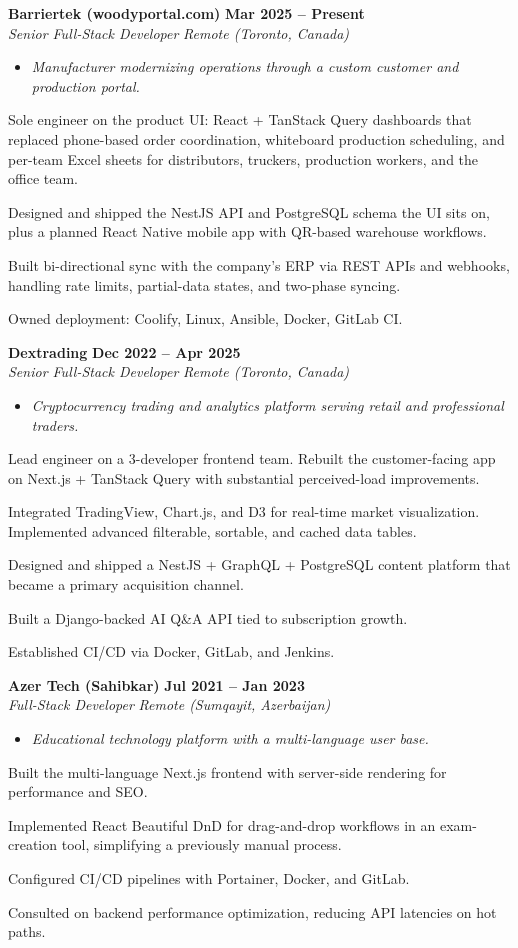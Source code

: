 \documentclass[letterpaper,10pt]{article}
\newcommand{\heading}[2]{
  \hspace{10pt}#1\hfill#2\\
}
\newcommand{\headingBf}[2]{
  \heading{\textbf{#1}}{\textbf{#2}}
}
\newcommand{\headingIt}[2]{
  \heading{\textit{#1}}{\textit{#2}}
}
\newenvironment{resume_list}{
  \vspace{-7pt}
  \begin{itemize}[itemsep=-2px, parsep=1pt, leftmargin=30pt]
}{
  \end{itemize}
  \vspace{2pt}
}
\newcommand{\companyDescription}[1]{
  \vspace{-7pt}
  \begin{itemize}[itemsep=-2px, parsep=1pt, leftmargin=12pt]
    \item[] {\color{textMuted}\textit{#1}}
  \end{itemize}
  \vspace{-4pt}
}
\begin{document}
  \headingBf{ Barriertek (woodyportal.com) }{ Mar 2025 -- Present }
  \headingIt{ Senior Full-Stack Developer }{ Remote (Toronto, Canada) }
  \companyDescription{ Manufacturer modernizing operations through a custom customer and production portal. }
  \begin{resume_list}
    \item Sole engineer on the product UI: React + TanStack Query dashboards that replaced phone-based order coordination, whiteboard production scheduling, and per-team Excel sheets for distributors, truckers, production workers, and the office team.
    \item Designed and shipped the NestJS API and PostgreSQL schema the UI sits on, plus a planned React Native mobile app with QR-based warehouse workflows.
    \item Built bi-directional sync with the company's ERP via REST APIs and webhooks, handling rate limits, partial-data states, and two-phase syncing.
    \item Owned deployment: Coolify, Linux, Ansible, Docker, GitLab CI.
  \end{resume_list}

  \headingBf{ Dextrading }{ Dec 2022 -- Apr 2025 }
  \headingIt{ Senior Full-Stack Developer }{ Remote (Toronto, Canada) }
  \companyDescription{ Cryptocurrency trading and analytics platform serving retail and professional traders. }
  \begin{resume_list}
    \item Lead engineer on a 3-developer frontend team. Rebuilt the customer-facing app on Next.js + TanStack Query with substantial perceived-load improvements.
    \item Integrated TradingView, Chart.js, and D3 for real-time market visualization. Implemented advanced filterable, sortable, and cached data tables.
    \item Designed and shipped a NestJS + GraphQL + PostgreSQL content platform that became a primary acquisition channel.
    \item Built a Django-backed AI Q\&A API tied to subscription growth.
    \item Established CI/CD via Docker, GitLab, and Jenkins.
  \end{resume_list}

  \headingBf{ Azer Tech (Sahibkar) }{ Jul 2021 -- Jan 2023 }
  \headingIt{ Full-Stack Developer }{ Remote (Sumqayit, Azerbaijan) }
  \companyDescription{ Educational technology platform with a multi-language user base. }
  \begin{resume_list}
    \item Built the multi-language Next.js frontend with server-side rendering for performance and SEO.
    \item Implemented React Beautiful DnD for drag-and-drop workflows in an exam-creation tool, simplifying a previously manual process.
    \item Configured CI/CD pipelines with Portainer, Docker, and GitLab.
    \item Consulted on backend performance optimization, reducing API latencies on hot paths.
  \end{resume_list}
\end{document}
